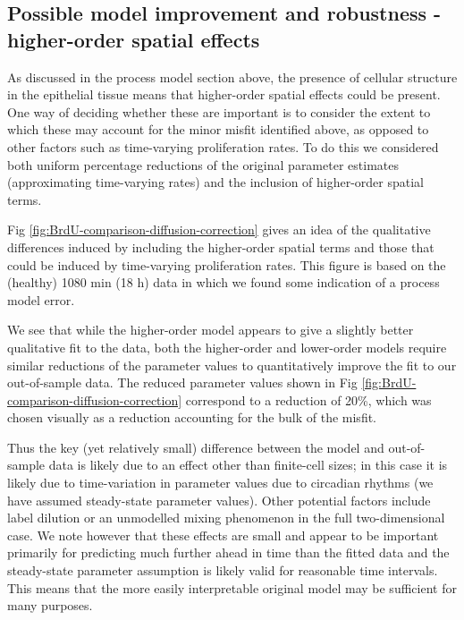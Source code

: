 \documentclass[10pt,letterpaper]{article}
\begin{document}
\subsection{Possible model improvement and robustness - higher-order
spatial
effects}\label{possible-model-improvement-and-robustness---higher-order-spatial-effects}

As discussed in the process model section above, the presence of
cellular structure in the epithelial tissue means that higher-order
spatial effects could be present. One way of deciding whether these are
important is to consider the extent to which these may account for the
minor misfit identified above, as opposed to other factors such as
time-varying proliferation rates. To do this we considered both uniform
percentage reductions of the original parameter estimates (approximating
time-varying rates) and the inclusion of higher-order spatial terms.

Fig \ref{fig:BrdU-comparison-diffusion-correction} gives an idea of the
qualitative differences induced by including the higher-order spatial
terms and those that could be induced by time-varying proliferation
rates. This figure is based on the (healthy) 1080 min (18 h) data in
which we found some indication of a process model error.

We see that while the higher-order model appears to give a slightly
better qualitative fit to the data, both the higher-order and
lower-order models require similar reductions of the parameter values to
quantitatively improve the fit to our out-of-sample data. The reduced
parameter values shown in Fig
\ref{fig:BrdU-comparison-diffusion-correction} correspond to a reduction
of 20\%, which was chosen visually as a reduction accounting for the
bulk of the misfit.

Thus the key (yet relatively small) difference between the model and
out-of-sample data is likely due to an effect other than finite-cell
sizes; in this case it is likely due to time-variation in parameter
values due to circadian rhythms (we have assumed steady-state parameter
values). Other potential factors include label dilution or an unmodelled
mixing phenomenon in the full two-dimensional case. We note however that
these effects are small and appear to be important primarily for
predicting much further ahead in time than the fitted data and the
steady-state parameter assumption is likely valid for reasonable time
intervals. This means that the more easily interpretable original model
may be sufficient for many purposes.
\end{document}
